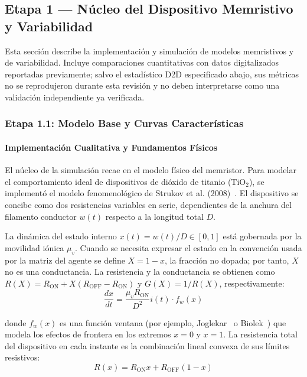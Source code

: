 
\subsection{Etapa 1 --- Núcleo del Dispositivo Memristivo y Variabilidad}
\label{ch:fase1}

Esta sección describe la implementación y simulación de modelos memristivos y de variabilidad. Incluye comparaciones cuantitativas con datos digitalizados reportadas previamente; salvo el estadístico D2D especificado abajo, sus métricas no se reprodujeron durante esta revisión y no deben interpretarse como una validación independiente ya verificada.

\subsubsection{Etapa 1.1: Modelo Base y Curvas Características}
\label{sec:etapa1_1}

\paragraph{Implementación Cualitativa y Fundamentos Físicos}
El núcleo de la simulación recae en el modelo físico del memristor. Para modelar el comportamiento ideal de dispositivos de dióxido de titanio (TiO$_2$), se implementó el modelo fenomenológico de Strukov et al. (2008)~\cite{26}. El dispositivo se concibe como dos resistencias variables en serie, dependientes de la anchura del filamento conductor $w(t)$ respecto a la longitud total $D$.

La dinámica del estado interno $x(t)=w(t)/D\in[0,1]$ está gobernada
por la movilidad iónica $\mu_v$. Cuando se necesita expresar el estado
en la convención usada por la matriz del agente se define
$X=1-x$, la fracción no dopada; por tanto, $X$ no es una conductancia.
La resistencia y la conductancia se obtienen como
$R(X)=R_{\mathrm{ON}}+X(R_{\mathrm{OFF}}-R_{\mathrm{ON}})$ y
$G(X)=1/R(X)$, respectivamente:
\begin{equation}
\frac{dx}{dt} = \frac{\mu_v R_{\mathrm{ON}}}{D^2} i(t) \cdot f_w(x)
\label{eq:strukov_dinamica}
\end{equation}

donde $f_w(x)$ es una función ventana (por ejemplo, Joglekar~\cite{37} o Biolek~\cite{34}) que modela los efectos de frontera en los extremos $x=0$ y $x=1$. La resistencia total del dispositivo en cada instante es la combinación lineal convexa de sus límites resistivos:
\begin{equation}
R(x) = R_{\mathrm{ON}} x + R_{\mathrm{OFF}} (1-x)
\label{eq:resistencia_lineal}
\end{equation}

